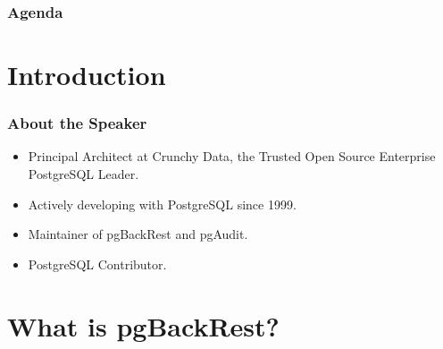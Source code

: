 \def\mytitle{Advanced pgBackRest}
\def\mysubject{}
\def\myevent{PGConf NYC 2023}
\def\myauthor{David Steele}
\def\myemail{}
\def\mydate{October 4, 2023}

\def\mysuppressnav{}

\def\mytemplatepath{/template/}


\begin{frame}[fragile]
    \frametitle{Agenda}
    \tableofcontents
\end{frame}

\section{Introduction}

\begin{frame}[fragile]
    \frametitle{About the Speaker}

    \begin{itemize}
        \item Principal Architect at Crunchy Data, the Trusted Open Source Enterprise PostgreSQL Leader.
        \item Actively developing with PostgreSQL since 1999.
        \item Maintainer of pgBackRest and pgAudit.
        \item PostgreSQL Contributor.
    \end{itemize}
\end{frame}

\section{What is pgBackRest?}

